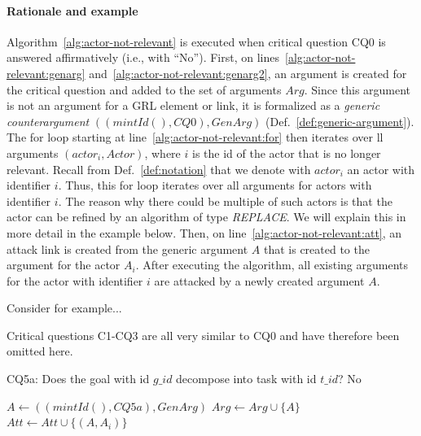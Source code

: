 \paragraph{Rationale and example} Algorithm~\ref{alg:actor-not-relevant} is executed when critical question CQ0 is answered affirmatively (i.e., with ``No''). First, on lines~\ref{alg:actor-not-relevant:genarg} and~\ref{alg:actor-not-relevant:genarg2}, an argument is created for the critical question and added to the set of arguments $Arg$. Since this argument is not an argument for a GRL element or link, it is formalized as a \emph{generic counterargument} $((mintId(), CQ0), GenArg)$ (Def.~\ref{def:generic-argument}). The for loop starting at line~\ref{alg:actor-not-relevant:for} then iterates over ll arguments $(actor_i,Actor)$, where $i$ is the id of the actor that is no longer relevant. Recall from Def.~\ref{def:notation} that we denote with $actor_i$ an actor with identifier $i$. Thus, this for loop iterates over all arguments for actors with identifier $i$. The reason why there could be multiple of such actors is that the actor can be refined by an algorithm of type \emph{REPLACE}. We will explain this in more detail in the example below. Then, on line~\ref{alg:actor-not-relevant:att}, an attack link is created from the generic argument $A$ that is created to the argument for the actor $A_i$. After executing the algorithm, all existing arguments for the actor with identifier $i$ are attacked by a newly created argument $A$.

Consider for example...

Critical questions C1-CQ3 are all very similar to CQ0 and have therefore been omitted here.

\begin{algorithm}[h]
  \caption{CQ5a: Does the goal with id $g\_id$ decompose into task with id $t\_id$? No}\label{alg:no-decomp}
  \begin{algorithmic}[1]
    \State $A \leftarrow ((mintId(),CQ5a),GenArg)$\label{alg:no-decomp:genarg}
    \State $Arg\leftarrow Arg \cup \{A\}$\label{alg:no-decomp:genarg2}
    \label{alg:no-decomp:for}
      \State $Att \leftarrow Att \cup \{(A,A_i)\}$\label{alg:no-decomp:att}
    \EndFor
    \EndProcedure
  \end{algorithmic}
\end{algorithm}

